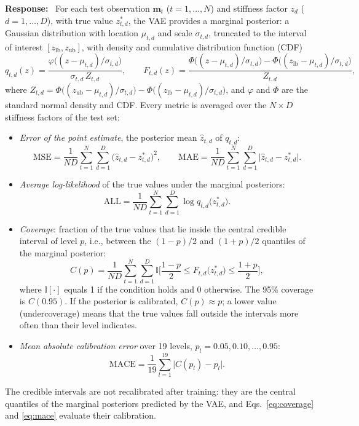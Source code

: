 \documentclass[11pt]{article}
\newenvironment{response}{\par\smallskip\noindent\color{resp}\textbf{Response:}\ }{\par}
\newcommand{\m}{\mathbf{m}}
\begin{document}
\begin{response}
	For each test observation $\m_t$ ($t=1,\dots,N$) and stiffness factor $z_d$ ($d=1,\dots,D$), with true value
	$z^*_{t,d}$, the VAE provides a marginal posterior: a Gaussian distribution with location $\mu_{t,d}$ and scale
	$\sigma_{t,d}$, truncated to the interval of interest $[z_{\text{lb}},z_{\text{ub}}]$, with density and cumulative distribution function (CDF)
	\begin{equation}
		q_{t,d}(z)=\frac{\varphi\big((z-\mu_{t,d})/\sigma_{t,d}\big)}{\sigma_{t,d}\,Z_{t,d}},\qquad
		F_{t,d}(z)=\frac{\Phi\big((z-\mu_{t,d})/\sigma_{t,d}\big)-\Phi\big((z_{\text{lb}}-\mu_{t,d})/\sigma_{t,d}\big)}{Z_{t,d}},
		\label{eq:marginal_tn}
	\end{equation}
	where $Z_{t,d}=\Phi\big((z_{\text{ub}}-\mu_{t,d})/\sigma_{t,d}\big)-\Phi\big((z_{\text{lb}}-\mu_{t,d})/\sigma_{t,d}\big)$, and $\varphi$ and
	$\Phi$ are the standard normal density and CDF. Every metric is averaged over the $N\times D$ stiffness factors of the
	test set:
	\begin{itemize}[leftmargin=*]
		\item \emph{Error of the point estimate}, the posterior mean $\hat z_{t,d}$ of $q_{t,d}$:
		\begin{equation}
			\mathrm{MSE}=\frac{1}{ND}\sum_{t=1}^{N}\sum_{d=1}^{D}\big(\hat z_{t,d}-z^*_{t,d}\big)^2,\qquad
			\mathrm{MAE}=\frac{1}{ND}\sum_{t=1}^{N}\sum_{d=1}^{D}\big|\hat z_{t,d}-z^*_{t,d}\big|.
			\label{eq:mse_mae}
		\end{equation}
		\item \emph{Average log-likelihood} of the true values under the marginal posteriors:
		\begin{equation}
			\mathrm{ALL}=\frac{1}{ND}\sum_{t=1}^{N}\sum_{d=1}^{D}\log q_{t,d}\big(z^*_{t,d}\big).
			\label{eq:all}
		\end{equation}
		\item \emph{Coverage}: fraction of the true values that lie inside the central credible interval of level $p$, i.e.,
		between the $(1-p)/2$ and $(1+p)/2$ quantiles of the marginal posterior:
		\begin{equation}
			C(p)=\frac{1}{ND}\sum_{t=1}^{N}\sum_{d=1}^{D}\mathbb{I}\Big[\frac{1-p}{2}\le F_{t,d}\big(z^*_{t,d}\big)\le\frac{1+p}{2}\Big],
			\label{eq:coverage}
		\end{equation}
		where $\mathbb{I}[\cdot]$ equals 1 if the condition holds and 0 otherwise. The 95\% coverage is $C(0.95)$. If the
		posterior is calibrated, $C(p)\approx p$; a lower value (undercoverage) means that the true values fall outside the
		intervals more often than their level indicates.
		\item \emph{Mean absolute calibration error} over 19 levels, $p_l=0.05,0.10,\dots,0.95$:
		\begin{equation}
			\mathrm{MACE}=\frac{1}{19}\sum_{l=1}^{19}\big|C(p_l)-p_l\big|.
			\label{eq:mace}
		\end{equation}
	\end{itemize}
	The credible intervals are not recalibrated after training: they are the central quantiles of the marginal posteriors
	predicted by the VAE, and Eqs.~\eqref{eq:coverage} and \eqref{eq:mace} evaluate their calibration.


\end{response}
\end{document}
